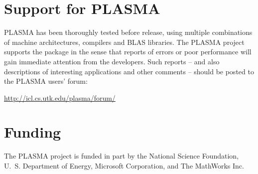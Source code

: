 \section{Support for PLASMA}

PLASMA has been thoroughly tested before release, using multiple
combinations of machine architectures, compilers and BLAS libraries.
The PLASMA project supports the package in the sense that reports of errors or poor performance
will gain immediate attention from the developers. Such reports -- and also descriptions of interesting
applications and other comments -- should be posted to the PLASMA users' forum:
\begin{link_url}
\url{http://icl.cs.utk.edu/plasma/forum/}
\end{link_url}


\section{Funding}

The PLASMA project is funded in part by the National Science Foundation, U.~S. Department of Energy,
Microsoft Corporation, and The MathWorks Inc.

